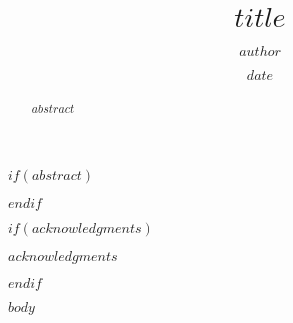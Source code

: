 \documentclass[$if(layout)$$layout$fancy, ms$endif$]{byuthesis}
\title{$title$}
\author{$author$}
\date{$date$}
\begin{document}
\frontmatter
\titlepage
\cleardoublepage

\customtitlepage
\cleardoublepage


$if(abstract)$
  \begin{abstract}
$abstract$
\end{abstract}
$endif$
\cleardoublepage

$if(acknowledgments)$
\begin{acknowledgments}
$acknowledgments$
\end{acknowledgments}
\cleardoublepage
$endif$

	\tableofcontents*
	\cleardoublepage

	\listoffigures
	\cleardoublepage

	\listoftables
	\cleardoublepage

\mainmatter
$body$
\end{document}
